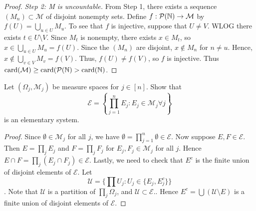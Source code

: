 \documentclass{article}
\begin{document}
\begin{proof}
\emph{Step 2: \mathcal M is uncountable.} 
From Step 1, there exists a sequence $(M_n) \subset \mathcal M$ of disjoint nonempty sets. Define $f : \mathcal P (\mathbb{N}) \to \mathcal M$ by $f(U) = \bigcup_{u \in U} M_u$.  To see that $f$ is injective, suppose that $U \neq V$.  WLOG there exists $t \in U \setminus V$.  Since $M_t$ is nonempty, there exists $x \in M_t$, so $x \in \bigcup_{u \in U} M_u = f(U) $. Since the $(M_n)$ are disjoint, $x \not\in M_n$ for $n \neq u$.  
Hence, $x \not\in \bigcup_{v\in V} M_v = f(V)$.  Thus, $f(U) \neq f(V)$, so $f$ is injective.  Thus $\operatorname{card}(\mathcal M) \ge \operatorname{card}(\mathcal P (\mathbb{N}) > \operatorname{card}(\mathbb{N})$.
\end{proof}


 Let $(\Omega_j , \mathcal M_j)$ be measure spaces for $j \in [n]$. Show that 
$$ \mathcal E = \left\{ \prod_{j=1}^n E_j : E_j \in \mathcal M_j \forall j \right\} $$
is an elementary system.

\begin{proof}
Since $\emptyset \in \mathcal M_j$ for all $j$, we have $\emptyset = \prod_{j=1}^n \emptyset \in \mathcal E$. Now suppose $E, F \in \mathcal E$. Then $E = \prod_j E_j$ and $F = \prod_j F_j$ for $E_j, F_j \in \mathcal M_j$ for all $j$. Hence $E \cap F = \prod_j (E_j \cap F_j) \in \mathcal E$.  Lastly, we need to check that $E^c$ is the finite union of disjoint elements of $\mathcal E$. Let 
$$\mathcal U = \{\prod U_j : U_j \in \{E_j, E_j^c \} \}$$.
Note that $\mathcal U$ is a partition of $\prod_j \Omega_j$, and $\mathcal U \subset \mathcal E$..  Hence $E^c = \bigcup (\mathcal U \setminus {E})$ is a finite union of disjoint elements of $\mathcal E$.
\end{proof}
\end{document}
